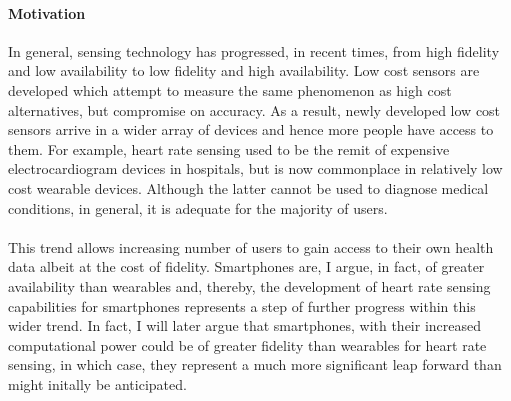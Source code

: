 \paragraph{Motivation}
In general, sensing technology has progressed, in recent times, from high fidelity and low availability to low fidelity and high availability.
Low cost sensors are developed which attempt to measure the same phenomenon as high cost alternatives, but compromise on accuracy.
As a result, newly developed low cost sensors arrive in a wider array of devices and hence more people have access to them.
For example, heart rate sensing used to be the remit of expensive electrocardiogram devices in hospitals, but is now commonplace in relatively low cost wearable devices. Although the latter cannot be used to diagnose medical conditions, in general, it is adequate for the majority of users.
\\\\
This trend allows increasing number of users to gain access to their own health data albeit at the cost of fidelity.
Smartphones are, I argue, in fact, of greater availability than wearables and, thereby, the development of heart rate sensing capabilities for 
smartphones represents a step of further progress within this wider trend. 
In fact, I will later argue that smartphones, with their increased computational power 
could be of greater fidelity than wearables for heart rate sensing, in which case, they represent a much more significant 
leap forward than might initally be anticipated.
